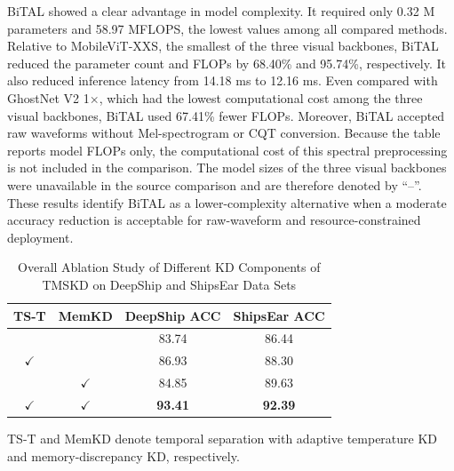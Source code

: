 ﻿\documentclass[lettersize,journal]{IEEEtran}
\begin{document}
BiTAL showed a clear advantage in model complexity. It required only 0.32 M parameters and 58.97 MFLOPS, the lowest values among all compared methods. Relative to MobileViT-XXS, the smallest of the three visual backbones, BiTAL reduced the parameter count and FLOPs by 68.40\% and 95.74\%, respectively. It also reduced inference latency from 14.18 ms to 12.16 ms. Even compared with GhostNet V2 1$\times$, which had the lowest computational cost among the three visual backbones, BiTAL used 67.41\% fewer FLOPs. Moreover, BiTAL accepted raw waveforms without Mel-spectrogram or CQT conversion. Because the table reports model FLOPs only, the computational cost of this spectral preprocessing is not included in the comparison. The model sizes of the three visual backbones were unavailable in the source comparison and are therefore denoted by ``--''. These results identify BiTAL as a lower-complexity alternative when a moderate accuracy reduction is acceptable for raw-waveform and resource-constrained deployment.

\begin{table}[htbp]
\centering
\small
\caption{Overall Ablation Study of Different KD Components of TMSKD on DeepShip and ShipsEar Data Sets}
\label{tab:ablation}
\setlength{\tabcolsep}{10pt}
\begin{tabular}{c|c|c|c}
\toprule
TS-T & MemKD  & DeepShip ACC & ShipsEar ACC \\
\midrule
    &      & 83.74 & 86.44 \\
$\checkmark$ &     &86.93 & 88.30 \\
 & $\checkmark$ &84.85 & 89.63 \\
$\checkmark$ & $\checkmark$ & \textbf{93.41} & \textbf{92.39} \\
\bottomrule
\end{tabular}
\vspace{2mm}
\begin{flushleft}
\footnotesize
TS-T and MemKD denote temporal separation with adaptive temperature KD and memory-discrepancy KD, respectively.
\end{flushleft}
\end{table}




\end{document}
